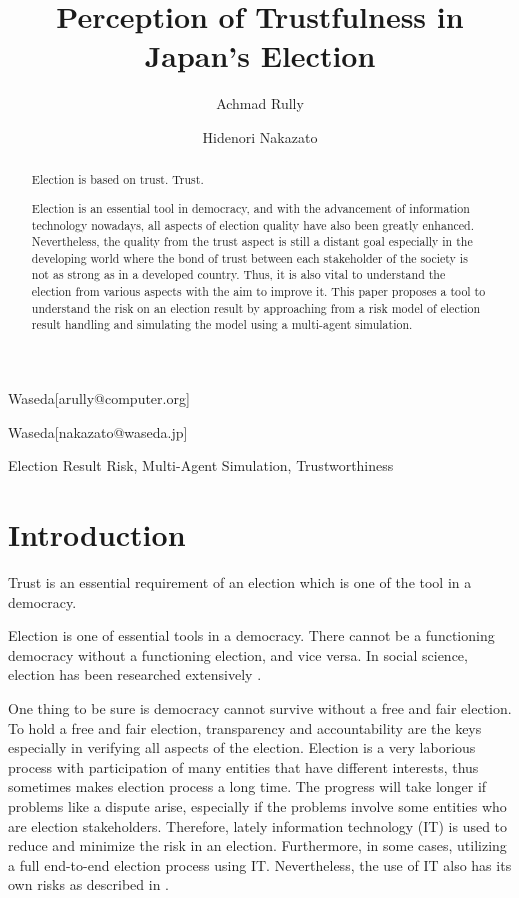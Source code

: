 \documentclass[JIP]{ipsj}
\begin{document}
\title{Perception of Trustfulness in Japan's Election}


\author{Achmad Rully}{Waseda}[arully@computer.org]
\author{Hidenori Nakazato}{Waseda}[nakazato@waseda.jp]


\begin{abstract}
Election is based on trust. Trust.



Election is an essential tool in democracy, and with the advancement of information technology nowadays, all aspects of election quality have also been greatly enhanced. Nevertheless, the quality from the trust aspect is still a distant goal especially in the developing world where the bond of trust between each stakeholder of the society is not as strong as in a developed country. Thus, it is also vital to understand the election from various aspects with the aim to improve it. This paper proposes a tool to understand the risk on an election result by approaching from a risk model of election result handling and simulating the model using a multi-agent simulation.
\end{abstract}

\begin{keyword}
Election Result Risk, Multi-Agent Simulation, Trustworthiness
\end{keyword}

\maketitle

\section{Introduction}
Trust is an essential requirement of an election which is one of the tool in a democracy.

Election is one of essential tools in a democracy. There cannot be a functioning democracy without a functioning election, and vice versa. In social science, election has been researched extensively \cite{Manan2010}.

One thing to be sure is democracy cannot survive without a free and fair election. To hold a free and fair election, transparency and accountability are the keys especially in verifying all aspects of the election. Election is a very laborious process with participation of many entities that have different interests, thus sometimes makes election process a long time. The progress will take longer if problems like a dispute arise, especially if the problems involve some entities who are election stakeholders. Therefore, lately information technology (IT) is used to reduce and minimize the risk in an election. Furthermore, in some cases, utilizing a full end-to-end election process using IT. Nevertheless, the use of IT also has its own risks as described in \cite{Neumann1995}.
\end{document}
